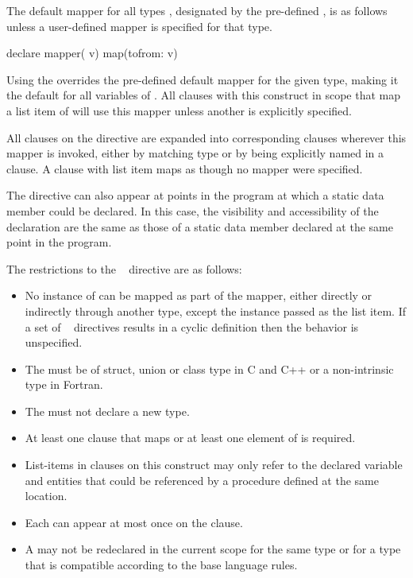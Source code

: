 The default mapper for all types , designated by the pre-defined
 , is as follows unless a user-defined 
mapper is specified for that type.

\begin{ompSyntax}
declare mapper( v) map(tofrom: v)
\end{ompSyntax}

Using the   overrides the pre-defined
default mapper for the given type, making it the default for all
variables of . All  clauses with this construct in scope
that map a list item of  will use this mapper unless another is
explicitly specified.

All  clauses on the directive are expanded into corresponding
 clauses wherever this mapper is invoked, either by matching type or
by being explicitly named in a  clause. A  clause with list item
 maps  as though no mapper were specified.

\begin{cppspecific}
The  directive can also appear at points in the program at
which a static data member could be declared. In this case, the visibility and
accessibility of the declaration are the same as those of a static data member
declared at the same point in the program.
\end{cppspecific}

\restrictions
The restrictions to the ~ directive are as follows:

\begin{itemize}
\item No instance of  can be mapped as part of the mapper, either
      directly or indirectly through another type, except the instance passed as the
      list item. If a set of ~ directives results in a
      cyclic definition then the behavior is unspecified.
\item The  must be of struct, union or class type in C and C++ or a
      non-intrinsic type in Fortran.
\item The  must not declare a new type.
\item At least one  clause that maps  or at least one element
      of  is required.
\item List-items in  clauses on this construct may only refer to the
      declared variable  and entities that could be referenced by a
      procedure defined at the same location.
\item Each  can appear at most once on the
       clause.
\item A  may not be redeclared in the current scope for the 
      same type or for a type that is compatible according to the base language rules.

\end{itemize}
